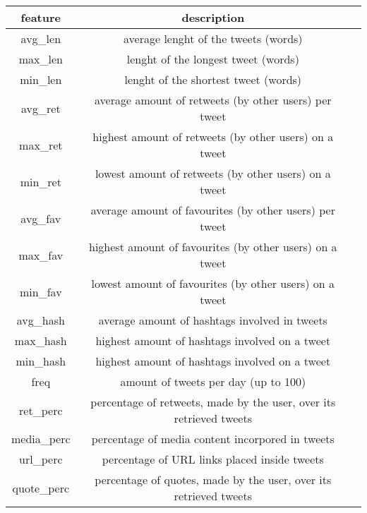 \small
\begin{center}
	\begin{tabular}{ccc}
		\\feature&description\\
		\hline\hline
		avg\_len&average lenght of the tweets (words)\\
		max\_len&lenght of the longest tweet (words)\\
		min\_len&lenght of the shortest tweet (words)\\
		avg\_ret&average amount of retweets (by other users) per tweet\\
		max\_ret&highest amount of retweets (by other users) on a tweet\\
		min\_ret&lowest amount of retweets (by other users) on a tweet\\
		avg\_fav&average amount of favourites (by other users) per tweet\\
		max\_fav&highest amount of favourites (by other users) on a tweet\\
		min\_fav&lowest amount of favourites (by other users) on a tweet\\
		avg\_hash&average amount of hashtags involved in tweets\\
		max\_hash&highest amount of hashtags involved on a tweet\\
		min\_hash&highest amount of hashtags involved on a tweet\\
		freq&amount of tweets per day (up to 100)\\
		ret\_perc&percentage of retweets, made by the user, over its retrieved tweets\\
		media\_perc&percentage of media content incorpored in tweets\\
		url\_perc&percentage of URL links placed inside tweets\\
		quote\_perc&percentage of quotes, made by the user, over its retrieved tweets\\
	\end{tabular}
\end{center}
\normalsize

